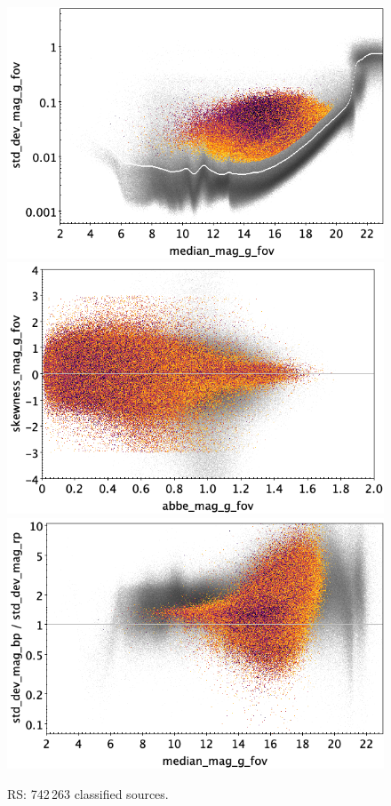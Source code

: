 \documentclass[longauth]{aa}
\begin{document}
\begin{appendix}
\begin{figure}
\hspace{2mm}
 \includegraphics[width=0.45\hsize]{figures/appendix/RS_cls_msd.png} \\ %
\vspace{4mm}
 \includegraphics[width=0.45\hsize]{figures/appendix/RS_cls_ask.png}  %
\hspace{2mm}
 \includegraphics[width=0.45\hsize]{figures/appendix/RS_cls_msdr.png}  \\ %
\vspace{4mm}
 \caption{RS: 742\,263 classified sources.}  
 \label{fig:app:RS}
\end{figure}


\end{appendix}
\end{document}
